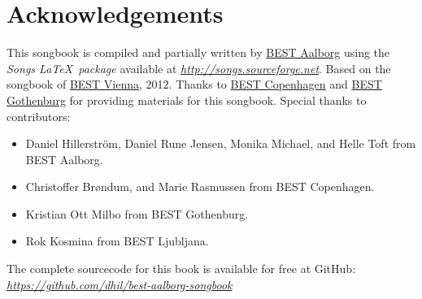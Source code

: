 \onecolumn
\thispagestyle{empty}
\section*{Acknowledgements}
This songbook is compiled and partially written by \href{http://best.aau.dk}{BEST Aalborg} using the \emph{Songs \LaTeX\ package} available at \href{http://songs.sourceforge.net}{\textit{http://songs.sourceforge.net}}.
Based on the songbook of \href{http://www.bestvienna.at}{BEST Vienna}, 2012. 
Thanks to \href{http://best.dtu.dk}{BEST Copenhagen} and \href{http://best.chs.chalmers.se/}{BEST Gothenburg} for providing materials for this songbook.
Special thanks to contributors:
\begin{itemize}
        \item Daniel Hillerström, Daniel Rune Jensen, Monika Michael, and Helle Toft from BEST Aalborg.
        \item Christoffer Brøndum, and Marie Rasmussen from BEST Copenhagen.
        \item Kristian Ott Milbo from BEST Gothenburg.
        \item Rok Kosmina from BEST Ljubljana.
\end{itemize}
The complete sourcecode for this book is available for free at GitHub: \href{https://github.com/dhil/best-aalborg-songbook}{\textit{https://github.com/dhil/best-aalborg-songbook}} 
\clearpage
\flushbottom

